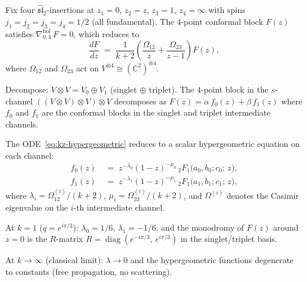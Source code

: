 \begin{computation}
\label{comp:shadow-connection-sl2-4pt}
Fix four $\widehat{\mathfrak{sl}}_2$-insertions at
$z_1=0$, $z_2=z$, $z_3=1$, $z_4=\infty$ with spins
$j_1=j_2=j_3=j_4=1/2$ (all fundamental).
The $4$-point conformal block $F(z)$ satisfies
$\nabla^{\mathrm{hol}}_{0,4}\,F=0$, which reduces to
\begin{equation}\label{eq:kz-hypergeometric}
\frac{dF}{dz}
\;=\;
\frac{1}{k+2}
\left(
\frac{\Omega_{12}}{z}
+\frac{\Omega_{23}}{z-1}
\right)F(z),
\end{equation}
where $\Omega_{12}$ and $\Omega_{23}$ act on
$V^{\otimes 4}\cong(\mathbb C^2)^{\otimes 4}$.

Decompose: $V\otimes V=V_0\oplus V_1$ (singlet $\oplus$
triplet). The $4$-point block in the $s$-channel
$((V\otimes V)\otimes V)\otimes V$ decomposes as
$F(z)=\alpha\,f_0(z)+\beta\,f_1(z)$
where $f_0$ and $f_1$ are the conformal blocks in the
singlet and triplet intermediate channels.

The ODE~\eqref{eq:kz-hypergeometric} reduces to
a scalar hypergeometric equation on each channel:
\begin{align*}
f_0(z)
&\;=\;
z^{-\lambda_0}(1-z)^{-\mu_0}\,
{}_2F_1\!\bigl(a_0,b_0;c_0;\,z\bigr),\\
f_1(z)
&\;=\;
z^{-\lambda_1}(1-z)^{-\mu_1}\,
{}_2F_1\!\bigl(a_1,b_1;c_1;\,z\bigr),
\end{align*}
where $\lambda_i=\Omega^{(i)}_{12}/(k{+}2)$,
$\mu_i=\Omega^{(i)}_{23}/(k{+}2)$, and
$\Omega^{(i)}$ denotes the Casimir eigenvalue
on the $i$-th intermediate channel.

At $k=1$ ($q=e^{i\pi/3}$): $\lambda_0=1/6$,
$\lambda_1=-1/6$, and the monodromy of $F(z)$ around
$z=0$ is the $R$-matrix
$R=\operatorname{diag}(e^{-i\pi/3},\,e^{i\pi/3})$
in the singlet/triplet basis.

At $k\to\infty$ (classical limit): $\lambda\to 0$ and
the hypergeometric functions degenerate to constants
(free propagation, no scattering).
\end{computation}

